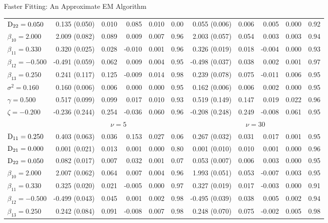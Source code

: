 \begin{chapter}{\label{cha:approx}Faster Fitting: An Approximate EM Algorithm}
\begin{table}[t]
\begin{tabular}{l|rrrrr:rrrrr}
    $\mathrm{D}_{22} = 0.050$ &  0.135 (0.050) & 0.010 &  0.085 & 0.010 & 0.00 &  0.055 (0.006) & 0.006 &  0.005 & 0.000 & 0.92 \\ 
    $\beta_{10} = 2.000$ &  2.009 (0.082) & 0.089 &  0.009 & 0.007 & 0.96 &  2.003 (0.057) & 0.054 &  0.003 & 0.003 & 0.94 \\ 
    $\beta_{11} = 0.330$ &  0.320 (0.025) & 0.028 & -0.010 & 0.001 & 0.96 &  0.326 (0.019) & 0.018 & -0.004 & 0.000 & 0.93 \\ 
    $\beta_{12} = -0.500$ & -0.491 (0.059) & 0.062 &  0.009 & 0.004 & 0.95 & -0.498 (0.037) & 0.038 &  0.002 & 0.001 & 0.97 \\ 
    $\beta_{13} = 0.250$ &  0.241 (0.117) & 0.125 & -0.009 & 0.014 & 0.98 &  0.239 (0.078) & 0.075 & -0.011 & 0.006 & 0.95 \\ 
    $\sigma^2 = 0.160$ &  0.160 (0.006) & 0.006 &  0.000 & 0.000 & 0.95 &  0.162 (0.006) & 0.006 &  0.002 & 0.000 & 0.95 \\ 
    $\gamma = 0.500$ &  0.517 (0.099) & 0.099 &  0.017 & 0.010 & 0.93 &  0.519 (0.149) & 0.147 &  0.019 & 0.022 & 0.96 \\ 
    $\zeta = -0.200$ & -0.236 (0.244) & 0.254 & -0.036 & 0.060 & 0.96 & -0.208 (0.248) & 0.249 & -0.008 & 0.061 & 0.95 \\ 
    \hline
    &  &  \\ 
    \hline
    $\mathrm{D}_{11} = 0.250$ &  0.403 (0.063) & 0.036 &  0.153 & 0.027 & 0.06 &  0.267 (0.032) & 0.031 &  0.017 & 0.001 & 0.95 \\ 
    $\mathrm{D}_{21} = 0.000$ &  0.001 (0.021) & 0.013 &  0.001 & 0.000 & 0.80 &  0.001 (0.010) & 0.010 &  0.001 & 0.000 & 0.96 \\ 
    $\mathrm{D}_{22} = 0.050$ &  0.082 (0.017) & 0.007 &  0.032 & 0.001 & 0.07 &  0.053 (0.007) & 0.006 &  0.003 & 0.000 & 0.95 \\ 
    $\beta_{10} = 2.000$ &  2.007 (0.062) & 0.064 &  0.007 & 0.004 & 0.96 &  1.993 (0.051) & 0.053 & -0.007 & 0.003 & 0.95 \\ 
    $\beta_{11} = 0.330$ &  0.325 (0.020) & 0.021 & -0.005 & 0.000 & 0.97 &  0.327 (0.019) & 0.017 & -0.003 & 0.000 & 0.91 \\ 
    $\beta_{12} = -0.500$ & -0.499 (0.043) & 0.045 &  0.001 & 0.002 & 0.98 & -0.495 (0.039) & 0.038 &  0.005 & 0.002 & 0.94 \\ 
    $\beta_{13} = 0.250$ &  0.242 (0.084) & 0.091 & -0.008 & 0.007 & 0.98 &  0.248 (0.070) & 0.075 & -0.002 & 0.005 & 0.98 \\ 

\end{tabular}
\end{table}
\end{chapter}
